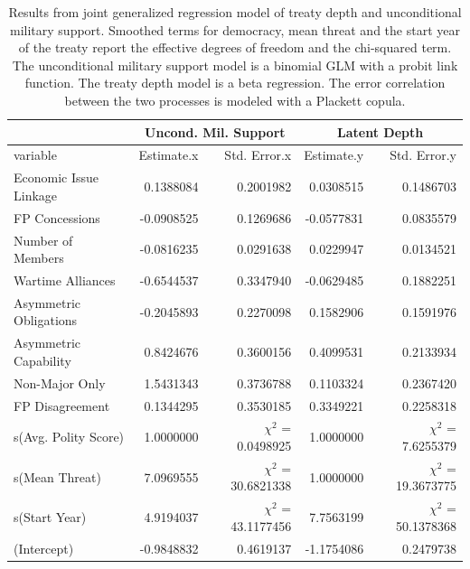 \documentclass[12pt]{article}
\begin{document}
\begin{table}[ht]
\centering
\begin{tabular}{lrrrr}
  & \multicolumn{2}{c}{Uncond. Mil. Support} & \multicolumn{2}{c}{Latent Depth}\\ \hline
variable & Estimate.x & Std. Error.x & Estimate.y & Std. Error.y \\ 
  \hline
  Economic Issue Linkage & 0.1388084 & 0.2001982 & 0.0308515 & 0.1486703 \\ 
  FP Concessions & -0.0908525 & 0.1269686 & -0.0577831 & 0.0835579 \\ 
  Number of Members & -0.0816235 & 0.0291638 & 0.0229947 & 0.0134521 \\ 
  Wartime Alliances & -0.6544537 & 0.3347940 & -0.0629485 & 0.1882251 \\ 
  Asymmetric Obligations & -0.2045893 & 0.2270098 & 0.1582906 & 0.1591976 \\ 
  Asymmetric Capability & 0.8424676 & 0.3600156 & 0.4099531 & 0.2133934 \\ 
  Non-Major Only & 1.5431343 & 0.3736788 & 0.1103324 & 0.2367420 \\ 
  FP Disagreement & 0.1344295 & 0.3530185 & 0.3349221 & 0.2258318 \\ 
  s(Avg. Polity Score) & 1.0000000 & $\chi^2$ = 0.0498925 & 1.0000000 & $\chi^2$ = 7.6255379 \\ 
  s(Mean Threat) & 7.0969555 & $\chi^2$ = 30.6821338 & 1.0000000 & $\chi^2$ = 19.3673775 \\ 
  s(Start Year) & 4.9194037 & $\chi^2$ = 43.1177456 & 7.7563199 & $\chi^2$ = 50.1378368 \\ 
  (Intercept) & -0.9848832 & 0.4619137 & -1.1754086 & 0.2479738 \\ 
   \hline
\end{tabular}
\caption{Results from joint generalized regression model of treaty depth and unconditional military support. 
          Smoothed terms for democracy, mean threat and the start year of the treaty report the effective degrees of freedom and the chi-squared term. 
                     The unconditional military support model is a binomial GLM with a probit link function. 
                     The treaty depth model is a beta regression. 
                     The error correlation between the two processes is modeled with a Plackett copula.} 
\label{tab:gjrm-res}
\end{table}
\end{document}
